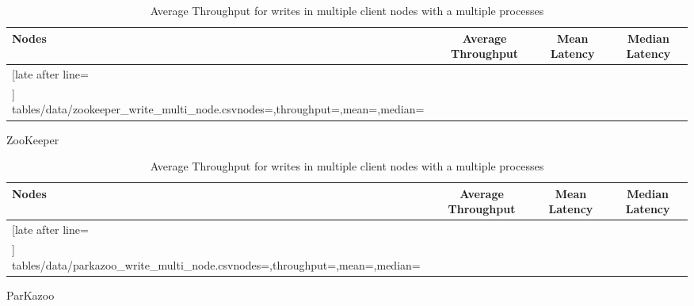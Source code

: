 \begin{table}[ht!]
	\begin{subtable}[t]{1.0\linewidth}
		\centering
		\begin{tabular}{|l|c|c|c|}\hline%
			\textbf{Nodes}   & \textbf{Average Throughput} & \textbf{Mean Latency} & \textbf{Median Latency} \\\hline
			\csvreader[late after line=\\\hline]%
			{tables/data/zookeeper_write_multi_node.csv}{nodes=\nodes,throughput=\throughput,mean=\mean,median=\median}%
			{\nodes & \throughput & \mean & \median}%
		\end{tabular}
		\caption{ZooKeeper}
		\label{table:zookeeper_multinode_write_throughput}
	\end{subtable}
	\begin{subtable}[t]{1.0\linewidth}
		\centering
		\begin{tabular}{|l|c|c|c|}\hline%
			\textbf{Nodes}   & \textbf{Average Throughput} & \textbf{Mean Latency} & \textbf{Median Latency}\\\hline
			\csvreader[late after line=\\\hline]%
			{tables/data/parkazoo_write_multi_node.csv}{nodes=\nodes,throughput=\throughput,mean=\mean,median=\median}%
			{\nodes & \throughput & \mean & \median}%
		\end{tabular}
		\caption{ParKazoo}
		\label{table:parkazoo_multinode_write_throughput}
	\end{subtable}

	\caption{Average Throughput for writes in multiple client nodes with a multiple processes}
	\label{table:multinode_write_throughput_all}
\end{table}
